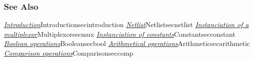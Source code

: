 \subsubsection{See Also}

\hyperref[ref]{\emph{Introduction}}{}{Introduction}{secintroduction}
\hyperref[ref]{\emph{Netlist}}{}{Netlist}{secnetlist}
\hyperref[ref]{\emph{Instanciation of a multiplexor}}{}{Multiplexor}{secmux}
\hyperref[ref]{\emph{Instanciation of constants}}{}{Constant}{secconstant}
\hyperref[ref]{\emph{Boolean operations}}{}{Boolean}{secbool}
\hyperref[ref]{\emph{Arithmetical operations}}{}{Arithmetic}{secarithmetic}
\hyperref[ref]{\emph{Comparison operations}}{}{Comparison}{seccomp}
